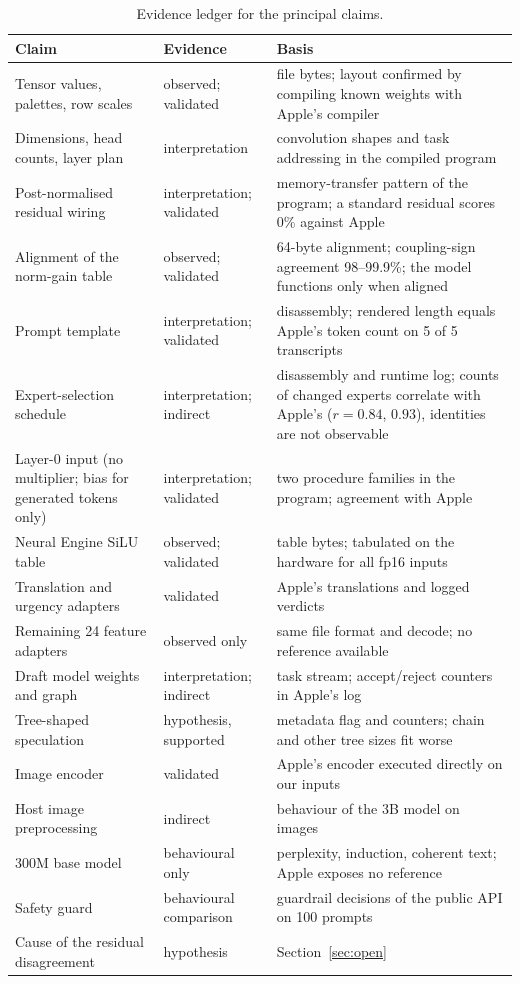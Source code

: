 \documentclass[11pt,reqno]{amsart}
\theoremstyle{definition}
\begin{document}
\begin{table}[!htbp]
\centering\footnotesize
\begin{tabular}{@{}p{50mm}p{31mm}p{76mm}@{}}
\toprule
Claim & Evidence & Basis \\
\midrule
Tensor values, palettes, row scales & observed; validated & file bytes; layout confirmed by compiling known weights with Apple's compiler \\
Dimensions, head counts, layer plan & interpretation & convolution shapes and task addressing in the compiled program \\
Post-normalised residual wiring & interpretation; validated & memory-transfer pattern of the program; a standard residual scores 0\% against Apple \\
Alignment of the norm-gain table & observed; validated & 64-byte alignment; coupling-sign agreement 98--99.9\%; the model functions only when aligned \\
Prompt template & interpretation; validated & disassembly; rendered length equals Apple's token count on 5 of 5 transcripts \\
Expert-selection schedule & interpretation; indirect & disassembly and runtime log; counts of changed experts correlate with Apple's ($r=0.84$, $0.93$), identities are not observable \\
Layer-0 input (no multiplier; bias for generated tokens only) & interpretation; validated & two procedure families in the program; agreement with Apple \\
Neural Engine SiLU table & observed; validated & table bytes; tabulated on the hardware for all fp16 inputs \\
Translation and urgency adapters & validated & Apple's translations and logged verdicts \\
Remaining 24 feature adapters & observed only & same file format and decode; no reference available \\
Draft model weights and graph & interpretation; indirect & task stream; accept/reject counters in Apple's log \\
Tree-shaped speculation & hypothesis, supported & metadata flag and counters; chain and other tree sizes fit worse \\
Image encoder & validated & Apple's encoder executed directly on our inputs \\
Host image preprocessing & indirect & behaviour of the 3B model on images \\
300M base model & behavioural only & perplexity, induction, coherent text; Apple exposes no reference \\
Safety guard & behavioural comparison & guardrail decisions of the public API on 100 prompts \\
Cause of the residual disagreement & hypothesis & Section~\ref{sec:open} \\
\bottomrule
\end{tabular}
\caption{Evidence ledger for the principal claims.}\label{tab:ledger}
\end{table}
\end{document}

